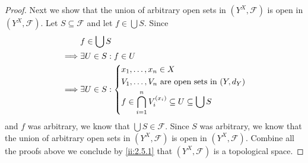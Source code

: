 \begin{proof}
  Next we show that the union of arbitrary open sets in \((Y^X, \mathcal{F})\) is open in \((Y^X, \mathcal{F})\).
  Let \(S \subseteq \mathcal{F}\) and let \(f \in \bigcup S\).
  Since
  \begin{align*}
             & f \in \bigcup S                                                                      \\
    \implies & \exists U \in S : f \in U                                                            \\
    \implies & \exists U \in S : \begin{dcases}
                                   x_1, \dots, x_n \in X                              \\
                                   V_1, \dots, V_n \text{ are open sets in } (Y, d_Y) \\
                                   f \in \bigcap_{i = 1}^n V_i^{(x_i)} \subseteq U \subseteq \bigcup S
                                 \end{dcases}
  \end{align*}
  and \(f\) was arbitrary, we know that \(\bigcup S \in \mathcal{F}\).
  Since \(S\) was arbitrary, we know that the union of arbitrary open sets in \((Y^X, \mathcal{F})\) is open in \((Y^X, \mathcal{F})\).
  Combine all the proofs above we conclude by \cref{ii:2.5.1} that \((Y^X, \mathcal{F})\) is a topological space.


\end{proof}
